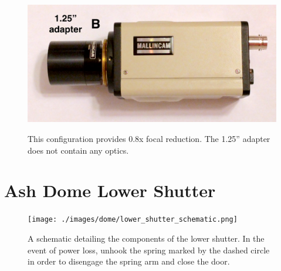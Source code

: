 \documentclass[12pt,titlepage]{article}
\begin{document}
\begin{appendix}
\begin{figure}[H]
	\begin{center}
		\includegraphics[width=.6\textwidth]{./images/mallincam/focal_reduction/B_adapter.jpg} 
		\label{mfr5_B}
		\caption{This configuration provides 0.8x focal reduction.
				The 1.25'' adapter does not contain any optics.}
	\end{center}
\end{figure}


\section{Ash Dome Lower Shutter}

\begin{figure}[H] 
	\begin{center}
		\texttt{[image: ./images/dome/lower\_shutter\_schematic.png]} 
		\label{azimuth_motor}
	\end{center}
	\caption{A schematic detailing the components of the lower shutter.
			In the event of power loss, unhook the spring marked by the dashed circle in
			order to disengage the spring arm and close the door.}
	\label{apdx:lower_shutter}
\end{figure}


\end{appendix}


\newpage
\nocite{*}
{}	

\clearpage
\end{document}
